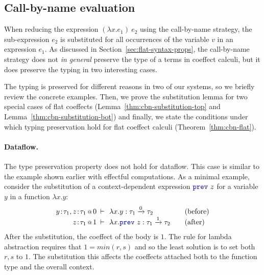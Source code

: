 
\subsection{Call-by-name evaluation}
\label{sec:flat-syntax-cbn}

When reducing the expression $(\lambda x.e_1)~e_2$ using the call-by-name strategy, the
sub-expression $e_2$ is substituted for all occurrences of the variable $v$ in an expression $e_1$.
As discussed in Section~\ref{sec:flat-syntax-props}, the call-by-name strategy does not \emph{in
general} preserve the type of a terms in coeffect calculi, but it does preserve the typing in two
interesting cases.

The typing is preserved for different reasons in two of our systems, so we briefly review the
concrete examples. Then, we prove the substitution lemma for two special cases of flat coeffects
(Lemma~\ref{thm:cbn-substitution-top} and Lemma~\ref{thm:cbn-substitution-bot}) and finally, we
state the conditions under which typing preservation hold for flat coeffect calculi
(Theorem~\ref{thm:cbn-flat}).

\paragraph{Dataflow.}
The type preservation property does not hold for dataflow. This case is similar to the example
shown earlier with effectful computations. As a minimal example, consider the substitution of
a context-dependent expression $\kvd{prev}~z$ for a variable $y$ in a function $\lambda x.y$:
%
\begin{equation*}
\begin{array}{rclcl}
 \coctx{y\!:\!\tau_1,z\!:\!\tau_1}{0} &\narrow{\vdash}& \lambda x.y : \tau_1 \xrightarrow{0} \tau_2 & & (\textnormal{before}) \\
 \coctx{z\!:\!\tau_1}{1} &\narrow{\vdash}& \lambda x.\kvd{prev}~z : \tau_1 \xrightarrow{1} \tau_2 & & (\textnormal{after}) \\
\end{array}
\end{equation*}
%
After the substitution, the coeffect of the body is $1$. The rule for lambda abstraction requires
that $1=\mathit{min}(r,s)$ and so the least solution is to set both $r,s$ to $1$. The substitution
this affects the coeffects attached both to the function type and the overall context.

